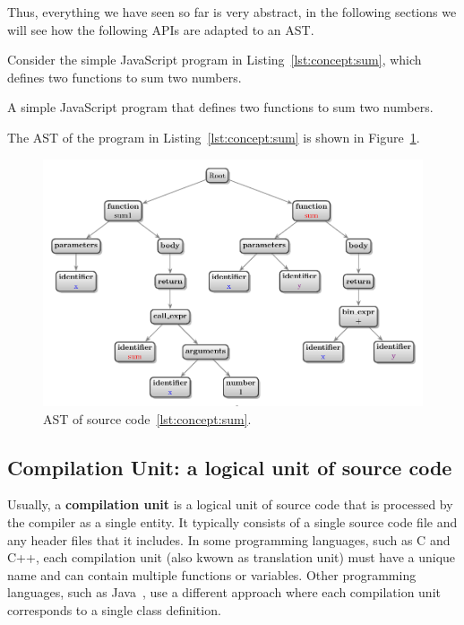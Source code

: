 Thus, everything we have seen so far is very abstract, in the following sections we will see how the following APIs are adapted to an AST.

Consider the simple JavaScript program in Listing~\ref{lst:concept:sum}, which defines two functions to sum two numbers.
\begin{Listing}[tbh]
    \centering
    \caption{A simple JavaScript program that defines two functions to sum two numbers.}
    \label{lst:concept:sum}
\end{Listing}

The AST of the program in Listing~\ref{lst:concept:sum} is shown in Figure~\ref{lst:concept:ast_sum}.
\begin{figure}[t]
    \centering
    \includegraphics[width=0.9\linewidth]{figs/concept/simple_ast.pdf}
    \caption{AST of source code~\ref{lst:concept:sum}.}
    \label{lst:concept:ast_sum}
\end{figure}

\subsection{Compilation Unit: a logical unit of source code}\label{subsec:concept:CompilationUnitALogicalUnitOfSourceCodeo}

Usually, a \textbf{compilation unit} is a logical unit of source code that is processed by the compiler as a single entity. It typically consists of a single source code file and any header files that it includes. In some programming languages, such as C and C++, each compilation unit (also kwown as translation unit) must have a unique name and can contain multiple functions or variables. Other programming languages, such as Java~\cite{javacompilationunits},  use a different approach where each compilation unit corresponds to a single class definition.

